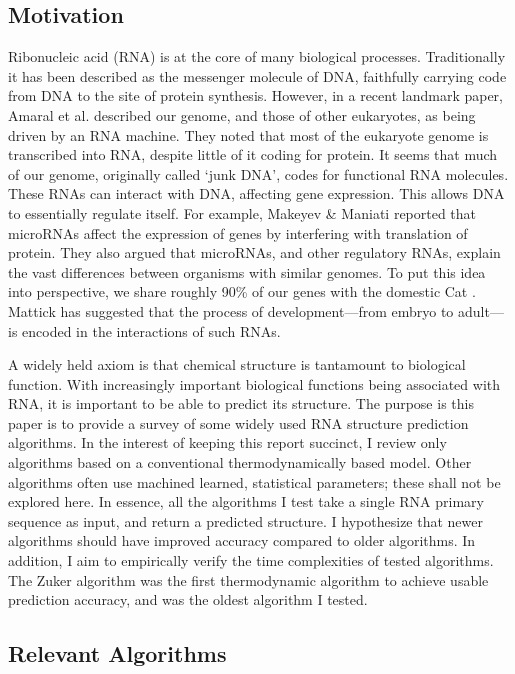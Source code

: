 \documentclass[12pt, a4paper]{article}
\begin{document}
\subsection{Motivation}
Ribonucleic acid (RNA) is at the core of many biological processes. Traditionally it has been described as the messenger molecule of DNA, faithfully carrying code from DNA to the site of protein synthesis. However, in a recent landmark paper, Amaral et al. \cite{amaral2008eukaryotic} described our genome, and those of other eukaryotes, as being driven by an RNA machine. They noted that most of the eukaryote genome is transcribed into RNA, despite little of it coding for protein. It seems that much of our genome, originally called `junk DNA', codes for functional RNA molecules. These RNAs can interact with DNA, affecting gene expression. This allows DNA to essentially regulate itself. For example, Makeyev \& Maniati \cite{makeyev2008multilevel} reported that microRNAs affect the expression of genes by interfering with translation of protein. They also argued that microRNAs, and other regulatory RNAs, explain the vast differences between organisms with similar genomes. To put this idea into perspective, we share roughly 90\% of our genes with the domestic Cat \cite{pontius2007initial}. Mattick \cite{mattick2007new} has suggested that the process of development---from embryo to adult---is encoded in the interactions of such RNAs.

A widely held axiom is that chemical structure is tantamount to biological function. With increasingly important biological functions being associated with RNA, it is important to be able to predict its structure. The purpose is this paper is to provide a survey of some widely used RNA structure prediction algorithms. In the interest of keeping this report succinct, I review only algorithms based on a conventional thermodynamically based model. Other algorithms often use machined learned, statistical parameters; these shall not be explored here. In essence, all the algorithms I test take a single RNA primary sequence as input, and return a predicted structure. I hypothesize that newer algorithms should have improved accuracy compared to older algorithms. In addition, I aim to empirically verify the time complexities of tested algorithms. The Zuker algorithm was the first thermodynamic algorithm to achieve usable prediction accuracy, and was the oldest algorithm I tested.

\subsection{Relevant Algorithms}
\end{document}
